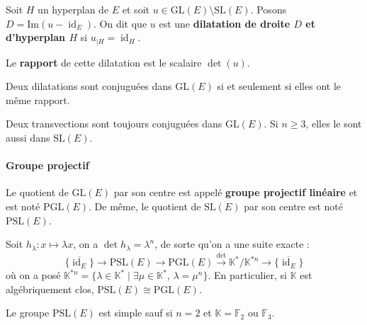   \begin{definition}
    Soit $H$ un hyperplan de $E$ et soit $u \in \mathrm{GL}(E) \setminus \mathrm{SL}(E)$. Posons $D = \mathrm{Im}(u - \operatorname{id}_E)$. On dit que $u$ est une \textbf{dilatation de droite $D$ et d'hyperplan $H$} si $u_{|H} = \operatorname{id}_H$.

    \medskip
    Le \textbf{rapport} de cette dilatation est le scalaire $\det(u)$.
  \end{definition}

  \begin{proposition}
    Deux dilatations sont conjuguées dans $\mathrm{GL}(E)$ si et seulement si elles ont le même rapport.
  \end{proposition}

  \begin{proposition}
    Deux transvections sont toujours conjuguées dans $\mathrm{GL}(E)$. Si $n \geq 3$, elles le sont aussi dans $\mathrm{SL}(E)$.
  \end{proposition}

  \paragraph{Groupe projectif}

  \begin{definition}
    Le quotient de $\mathrm{GL}(E)$ par son centre est appelé \textbf{groupe projectif linéaire} et est noté $\mathrm{PGL}(E)$. De même, le quotient de $\mathrm{SL}(E)$ par son centre est noté $\mathrm{PSL}(E)$.
  \end{definition}

  \begin{remark}
    Soit $h_\lambda : x \mapsto \lambda x$, on a $\det h_\lambda = \lambda^n$, de sorte qu'on a une suite exacte :
    \[ \{ \overline{\operatorname{id}_E} \} \rightarrow \mathrm{PSL}(E) \rightarrow \mathrm{PGL}(E) \xrightarrow{\overline{\det}} \mathbb{K}^*/\mathbb{K}^{*n} \rightarrow \{ \overline{\operatorname{id}_E} \} \]
    où on a posé $\mathbb{K}^{*n} = \{ \lambda \in \mathbb{K}^* \mid \exists \mu \in \mathbb{K}^*, \, \lambda = \mu^n \}$. En particulier, si $\mathbb{K}$ est algébriquement clos, $\mathrm{PSL}(E) \cong \mathrm{PGL}(E)$.
  \end{remark}

  \begin{theorem}
    Le groupe $\mathrm{PSL}(E)$ est simple sauf si $n = 2$ et $\mathbb{K} = \mathbb{F}_2$ ou $\mathbb{F}_3$.
  \end{theorem}

